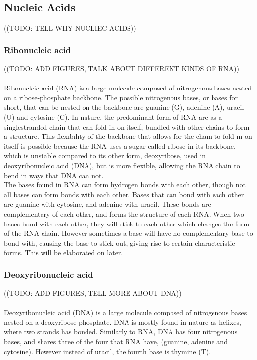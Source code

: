 \documentclass{article}
\begin{document}
\subsection{Nucleic Acids}
((TODO: TELL WHY NUCLIEC ACIDS))
\subsubsection{Ribonucleic acid} %
((TODO: ADD FIGURES, TALK ABOUT DIFFERENT KINDS OF RNA))\\\\
Ribonucleic acid (RNA) is a large molecule composed of nitrogenous 
bases nested on a ribose-phosphate backbone. The possible nitrogenous bases, or 
bases for short, 
that can be nested on the backbone are guanine (G), adenine (A), uracil (U) and cytosine 
(C). In nature, the predominant form of RNA are as a singlestranded chain 
that can fold in on itself, bundled with other chains to form a structure. 
This flexibility of the backbone that allows for the chain to fold in on itself 
is possible because the RNA uses a sugar called ribose in its backbone, 
which is unstable compared to its other form, deoxyribose, used in 
deoxyribonucleic acid (DNA), but is more flexible, allowing the RNA chain to 
bend in ways that DNA can not.\\

The bases found in RNA can form hydrogen bonds with each other, though not all 
bases can form bonds with each other. Bases that can bond with each other are 
guanine with cytosine, and adenine with uracil. These bonds are complementary 
of each other, and forms the structure of each RNA. When 
two bases bond with each other, they will stick to each other 
which changes the form of the RNA chain. However sometimes a base will have no 
complementary base to bond with, causing the base to stick out, giving rise to 
certain characteristic forms. This will be elaborated on later.

\subsubsection{Deoxyribonucleic acid}
((TODO: ADD FIGURES, TELL MORE ABOUT DNA))\\\\
Deoxyribonucleic acid (DNA) is a large molecule composed of nitrogenous bases 
nested on a deoxyribose-phosphate. DNA is mostly found in nature as helixes, 
where two strands has bonded. Similarly to RNA, DNA has four nitrogenous 
bases, and shares three of the four that RNA have, (guanine, adenine and cytosine). 
However instead of uracil, the fourth base is thymine (T). 
\end{document}
